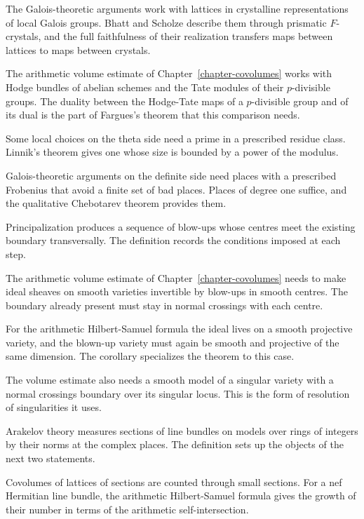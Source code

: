 The Galois-theoretic arguments work with lattices in crystalline
representations of local Galois groups. Bhatt and Scholze describe them through
prismatic $F$-crystals, and the full faithfulness of their realization
transfers maps between lattices to maps between crystals.

The arithmetic volume estimate of Chapter~\ref{chapter-covolumes} works with
Hodge bundles of abelian schemes and the Tate modules of their $p$-divisible
groups. The duality between the
Hodge-Tate maps of a $p$-divisible group and of its dual is the part of
Fargues's theorem that this comparison needs.

Some local choices on the theta side need a prime in a prescribed residue
class. Linnik's theorem gives one whose size is bounded by a power of the
modulus.

Galois-theoretic arguments on the definite side need places with a prescribed
Frobenius that avoid a finite set of bad places. Places of degree one suffice,
and the qualitative Chebotarev theorem provides them.

Principalization produces a sequence of blow-ups whose centres meet the
existing boundary transversally. The definition records the conditions imposed
at each step.

The arithmetic volume estimate of Chapter~\ref{chapter-covolumes} needs to
make ideal sheaves on smooth varieties invertible by blow-ups in smooth
centres. The boundary already present must stay in normal crossings with each
centre.

For the arithmetic Hilbert-Samuel formula the ideal lives on a smooth
projective variety, and the blown-up variety must again be smooth and
projective of the same dimension. The corollary specializes the theorem to
this case.

The volume estimate also needs a smooth model of a singular variety with a
normal crossings boundary over its singular locus. This is the form of
resolution of singularities it uses.

Arakelov theory measures sections of line bundles on models over rings of
integers by their norms at the complex places. The definition sets up the
objects of the next two statements.

Covolumes of lattices of sections are counted through small sections. For a
nef Hermitian line bundle, the arithmetic Hilbert-Samuel formula gives the
growth of their number in terms of the arithmetic self-intersection.

